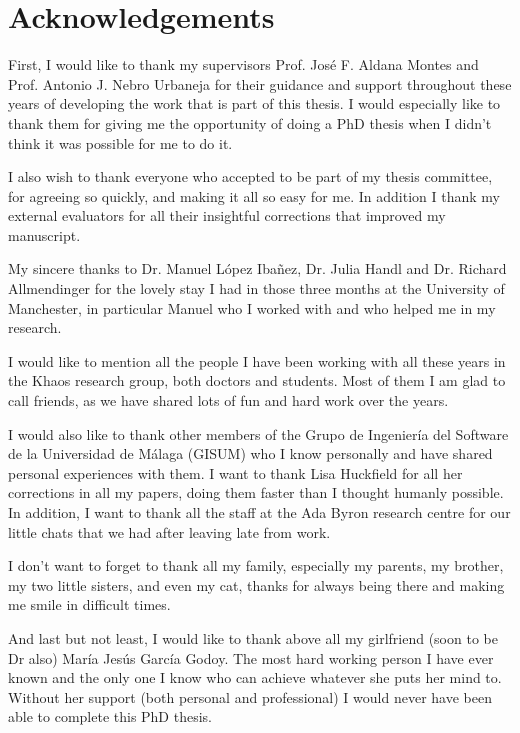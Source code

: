 \chapter*{Acknowledgements}


First, I would like to thank my supervisors Prof. José F. Aldana Montes and Prof. Antonio J. Nebro Urbaneja for their guidance and support throughout these years of developing the work that is part of this thesis. I would especially like to thank them for giving me the opportunity of doing a PhD thesis when I didn't think it was possible for me to do it.

I also wish to thank everyone who accepted to be part of my thesis committee, for agreeing so quickly, and making it all so easy for me. In addition I thank my external evaluators for all their insightful corrections that improved my manuscript.

My sincere thanks to Dr. Manuel López Ibañez, Dr. Julia Handl and Dr. Richard Allmendinger for the lovely stay I had in those three months at the University of Manchester, in particular Manuel who I worked with and who helped me in my research.

I would like to mention all the people I have been working with all these years in the Khaos research group, both doctors and students. Most of them I am glad to call friends, as we have shared lots of fun and hard work over the years.

I would also like to thank other members of the Grupo de Ingeniería del Software de la Universidad de Málaga (GISUM) who I know personally and have shared personal experiences with them. I want to thank Lisa Huckfield for all her corrections in all my papers, doing them faster than I thought humanly possible. In addition, I want to thank all the staff at the Ada Byron research centre for our little chats that we had after leaving late from work.

I don't want to forget to thank all my family, especially my parents, my brother, my two little sisters, and even my cat, thanks for always being there and making me smile in difficult times.

And last but not least, I would like to thank above all my girlfriend (soon to be Dr also) María Jesús García Godoy. The most hard working person I have ever known and the only one I know who can achieve whatever she puts her mind to. Without her support (both personal and professional) I would never have been able to complete this PhD thesis.
